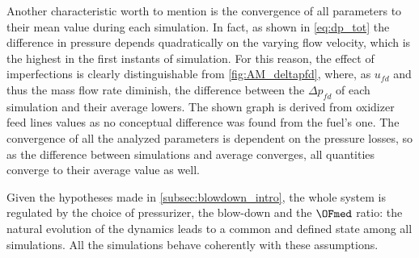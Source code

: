 
Another characteristic worth to mention is the convergence of all parameters to their mean value during each simulation.
In fact, as shown in \autoref{eq:dp_tot} the difference in pressure depends quadratically on the varying flow velocity, which is the highest in the first instants of simulation.
For this reason, the effect of imperfections is clearly distinguishable from \autoref{fig:AM_deltapfd}, where, as $u_{fd}$ and thus the mass flow rate diminish, the difference between the $\Delta p_{fd}$ of each simulation and their average lowers. The shown graph is derived from oxidizer feed lines values as no conceptual difference was found from the fuel's one. The convergence of all the analyzed parameters is dependent on the pressure losses, so as the difference between simulations and average converges, all quantities converge to their average value as well.

Given the hypotheses made in \autoref{subsec:blowdown_intro}, the whole system is regulated by the choice of pressurizer, the blow-down and the $\OFmed$ ratio: the natural evolution of the dynamics leads to a common and defined state among all simulations. All the simulations behave coherently  with these assumptions.











